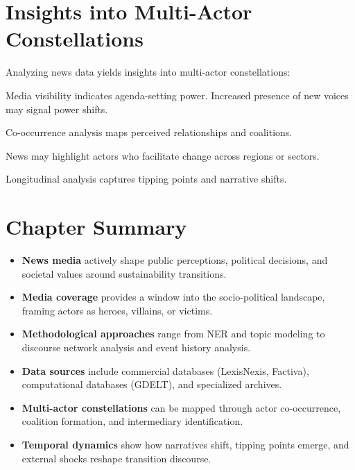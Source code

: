 \documentclass[../main.tex]{subfiles}
\begin{document}
\section*{Insights into Multi-Actor Constellations}

Analyzing news data yields insights into multi-actor constellations:

\begin{description}[leftmargin=0.5cm, itemsep=0.3em]
\item[Power Dynamics] Media visibility indicates agenda-setting power. Increased presence of new voices may signal power shifts.

\item[Actor Networks] Co-occurrence analysis maps perceived relationships and coalitions.

\item[Intermediary Identification] News may highlight actors who facilitate change across regions or sectors.

\item[Temporal Dynamics] Longitudinal analysis captures tipping points and narrative shifts.
\end{description}


\section*{Chapter Summary}

\begin{summarybox}
\begin{itemize}[leftmargin=*, itemsep=0.3em]
\item \textbf{News media} actively shape public perceptions, political decisions, and societal values around sustainability transitions.

\item \textbf{Media coverage} provides a window into the socio-political landscape, framing actors as heroes, villains, or victims.

\item \textbf{Methodological approaches} range from NER and topic modeling to discourse network analysis and event history analysis.

\item \textbf{Data sources} include commercial databases (LexisNexis, Factiva), computational databases (GDELT), and specialized archives.

\item \textbf{Multi-actor constellations} can be mapped through actor co-occurrence, coalition formation, and intermediary identification.

\item \textbf{Temporal dynamics} show how narratives shift, tipping points emerge, and external shocks reshape transition discourse.
\end{itemize}
\end{summarybox}
\end{document}

